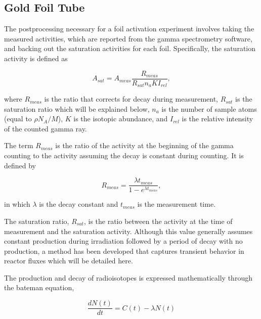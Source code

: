 \subsection{Gold Foil Tube}


The postprocessing necessary for a foil activation experiment involves taking the measured activities, which are reported from the gamma spectrometry software, and backing out the saturation activities for each foil.
Specifically, the saturation activity is defined as

\begin{equation}
\label{eqn:a_sat}
A_{sat} = A_{meas} \frac{R_{meas}}{R_{sat} n_a K I_{rel}} ,
\end{equation}

\noindent
where $R_{meas}$ is the ratio that corrects for decay during measurement, $R_{sat}$ is the saturation ratio which will be explained below, $n_a$ is the number of sample atoms (equal to $\rho N_A / M$), $K$ is the isotopic abundance, and $I_{rel}$ is the relative intensity of the counted gamma ray.

The term $R_{meas}$ is the ratio of the activity at the beginning of the gamma counting to the activity assuming the decay is constant during counting.
It is defined by

\begin{equation}
\label{eqn:r_meas}
R_{meas} = \frac{\lambda t_{meas}}{1 - e^{\lambda t_{meas}}},
\end{equation}

\noindent
in which $\lambda$ is the decay constant and $t_{meas}$ is the measurement time.

The saturation ratio, $R_{sat}$, is the ratio between the activity at the time of measurement and the saturation activity.
Although this value generally assumes constant production during irradiation followed by a period of decay with no production, a method has been developed that captures transient behavior in reactor fluxes which will be detailed here.

The production and decay of radioisotopes is expressed mathematically through the bateman equation,

\begin{equation}
\label{eqn:bateman}
\frac{dN(t)}{dt} = C(t) - \lambda N(t)
\end{equation}

